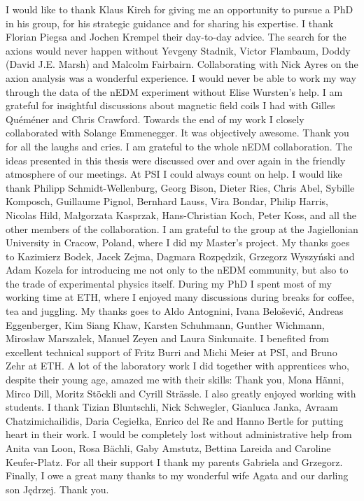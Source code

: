 I would like to thank Klaus Kirch for giving me an opportunity to pursue a PhD in his group, for his strategic guidance and for sharing his expertise.
I thank Florian Piegsa and Jochen Krempel their day-to-day advice.
The search for the axions would never happen without Yevgeny Stadnik, Victor Flambaum, Doddy (David J.E.
Marsh) and Malcolm Fairbairn.
Collaborating with Nick Ayres on the axion analysis was a wonderful experience.
I would never be able to work my way through the data of the nEDM experiment without Elise Wursten's help.
I am grateful for insightful discussions about magnetic field coils I had with Gilles Quéméner and Chris Crawford.
Towards the end of my work I closely collaborated with Solange Emmenegger.
It was objectively awesome.
Thank you for all the laughs and cries.
I am grateful to the whole nEDM collaboration.
The ideas presented in this thesis were discussed over and over again in the friendly atmosphere of our meetings. At PSI I could always count on help.
I would like thank
Philipp Schmidt-Wellenburg,
Georg Bison,
Dieter Ries,
Chris Abel,
Sybille Komposch,
Guillaume Pignol,
Bernhard Lauss,
Vira Bondar,
Philip Harris,
Nicolas Hild,
Małgorzata Kasprzak,
Hans-Christian Koch,
Peter Koss,
and all the other members of the collaboration.
I am grateful to the group at the Jagiellonian University in Cracow, Poland, where I did my Master's project.
My thanks goes to
Kazimierz Bodek,
Jacek Zejma,
Dagmara Rozpędzik,
Grzegorz Wyszyński and
Adam Kozela
for introducing me not only to the nEDM community, but also to the trade of experimental physics itself.
During my PhD I spent most of my working time at ETH, where I enjoyed many discussions during breaks for coffee, tea and juggling.
My thanks goes to
Aldo Antognini,
Ivana Belo\v{s}ević,
Andreas Eggenberger,
Kim Siang Khaw,
Karsten Schuhmann,
Gunther Wichmann,
Mirosław Marszałek,
Manuel Zeyen and
Laura Sinkunaite.
I benefited from excellent technical support of Fritz Burri and Michi Meier at PSI, and Bruno Zehr at ETH\@.
A lot of the laboratory work I did together with apprentices who, despite their young age, amazed me with their skills:
Thank you,
Mona Hänni,
Mirco Dill,
Moritz Stöckli and
Cyrill Strässle.
I also greatly enjoyed working with students.
I thank
Tizian Bluntschli,
Nick Schwegler,
Gianluca Janka,
Avraam Chatzimichailidis,
Daria Cegiełka,
Enrico del Re and
Hanno Bertle for putting heart in their work.
I would be completely lost without administrative help from Anita van Loon, Rosa Bächli,
Gaby Amstutz, Bettina Lareida and Caroline Keufer-Platz.
For all their support I thank my parents Gabriela and Grzegorz.
Finally, I owe a great many thanks to my wonderful wife Agata and our darling son Jędrzej. Thank you.

